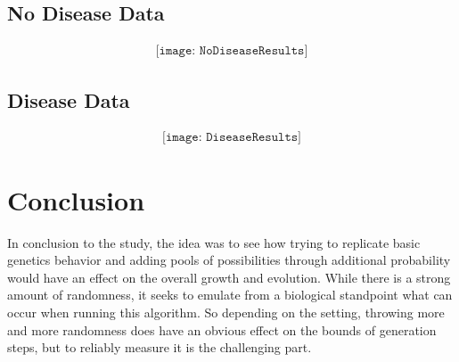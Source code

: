 \documentclass[paper=a4, fontsize=11pt]{scrartcl}
\numberwithin{equation}{section}		%
\numberwithin{figure}{section}			%
\numberwithin{table}{section}				%
\begin{document}
    \subsection{No Disease Data}
    \begin{align} 
        \texttt{[image: NoDiseaseResults]}				
    \end{align}
    \subsection{Disease Data}
    \begin{align} 
        \texttt{[image: DiseaseResults]}				
    \end{align}

    \section{Conclusion}
    In conclusion to the study, the idea was to see how trying to replicate basic genetics behavior
    and adding pools of possibilities through additional probability would have an effect on the 
    overall growth and evolution.  While there is a strong amount of randomness,  it seeks to emulate
    from a biological standpoint what can occur when running this algorithm.  So depending on the 
    setting, throwing more and more randomness does have an obvious effect on the bounds of generation steps,
    but to reliably measure it is the challenging part.


    
\end{document}
